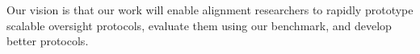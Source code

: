 


Our vision is that our work will enable alignment researchers to rapidly prototype scalable oversight protocols, evaluate them using our benchmark, 
and develop better protocols. 




